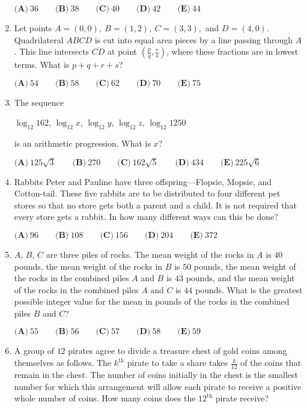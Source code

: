 \documentclass{article}
\begin{document}
\begin{enumerate}[label=\arabic*., itemsep=0.5em]
\( \textbf{(A)}\ 36\qquad\textbf{(B)}\ 38\qquad\textbf{(C)}\ 40\qquad\textbf{(D)}\ 42\qquad\textbf{(E)}\ 44\)\par \vspace{0.5em}\item Let points \( A = (0,0) , \ B = (1,2), \ C = (3,3), \) and \( D = (4,0) \). Quadrilateral \( ABCD \) is cut into equal area pieces by a line passing through \( A \). This line intersects \( \overline{CD} \) at point \( \left (\frac{p}{q}, \frac{r}{s} \right ) \), where these fractions are in lowest terms. What is \( p + q + r + s \)?

\( \textbf{(A)} \ 54 \qquad \textbf{(B)} \ 58 \qquad  \textbf{(C)} \ 62 \qquad \textbf{(D)} \ 70 \qquad \textbf{(E)} \ 75 \)\par \vspace{0.5em}\item The sequence

\(\log_{12}{162}\), \(\log_{12}{x}\), \(\log_{12}{y}\), \(\log_{12}{z}\), \(\log_{12}{1250}\)

is an arithmetic progression. What is \(x\)?

\( \textbf{(A)} \ 125\sqrt{3} \qquad \textbf{(B)} \ 270 \qquad \textbf{(C)} \ 162\sqrt{5} \qquad \textbf{(D)} \ 434 \qquad \textbf{(E)} \ 225\sqrt{6}\)\par \vspace{0.5em}\item Rabbits Peter and Pauline have three offspring—Flopsie, Mopsie, and Cotton-tail. These five rabbits are to be distributed to four different pet stores so that no store gets both a parent and a child. It is not required that every store gets a rabbit. In how many different ways can this be done?

\(\textbf{(A)} \ 96 \qquad  \textbf{(B)} \ 108 \qquad  \textbf{(C)} \ 156 \qquad  \textbf{(D)} \ 204 \qquad  \textbf{(E)} \ 372 \)\par \vspace{0.5em}\item \(A\), \(B\), \(C\) are three piles of rocks. The mean weight of the rocks in \(A\) is \(40\) pounds, the mean weight of the rocks in \(B\) is \(50\) pounds, the mean weight of the rocks in the combined piles \(A\) and \(B\) is \(43\) pounds, and the mean weight of the rocks in the combined piles \(A\) and \(C\) is \(44\) pounds. What is the greatest possible integer value for the mean in pounds of the rocks in the combined piles \(B\) and \(C\)?

\( \textbf{(A)} \ 55 \qquad \textbf{(B)} \ 56 \qquad \textbf{(C)} \ 57 \qquad \textbf{(D)} \ 58 \qquad \textbf{(E)} \ 59\)\par \vspace{0.5em}\item A group of \( 12 \) pirates agree to divide a treasure chest of gold coins among themselves as follows. The \( k^\text{th} \) pirate to take a share takes \( \frac{k}{12} \) of the coins that remain in the chest. The number of coins initially in the chest is the smallest number for which this arrangement will allow each pirate to receive a positive whole number of coins. How many coins does the \( 12^{\text{th}} \) pirate receive?


\end{enumerate}
\end{document}
